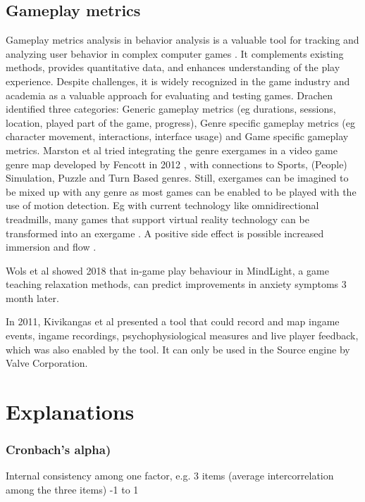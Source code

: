 \section{Gameplay metrics}
Gameplay metrics analysis in behavior analysis is a valuable tool for tracking and analyzing user behavior in complex computer games \cite{drachen2015behavioral}. It complements existing methods, provides quantitative data, and enhances understanding of the play experience. Despite challenges, it is widely recognized in the game industry and academia as a valuable approach for evaluating and testing games. Drachen identified three categories: Generic gameplay metrics (eg durations, sessions, location, played part of the game, progress), Genre specific gameplay metrics (eg character movement, interactions, interface usage) and Game specific gameplay metrics.
Marston et al \cite{marston2013play} tried integrating the genre exergames in a video game genre map developed by Fencott in 2012 \cite{clay2012game}, with connections to Sports, (People) Simulation, Puzzle and Turn Based genres. Still, exergames can be imagined to be mixed up with any genre as most games can be enabled to be played with the use of motion detection. Eg with current technology like omnidirectional treadmills, many games that support virtual reality technology can be transformed into an exergame \cite{link_katvr}. A positive side effect is possible increased immersion and flow \cite{wehden2021slippery}.

Wols et al \cite{wols2018game} showed 2018 that in-game play behaviour in MindLight, a game teaching relaxation methods, can predict improvements in anxiety symptoms 3 month later.

In 2011, Kivikangas et al \cite{kivikangas2011developing} presented a tool that could record and map ingame events, ingame recordings, psychophysiological measures and live player feedback, which was also enabled by the tool. It can only be used in the Source engine by Valve Corporation.




\chapter{Explanations}


\subsection{Cronbach's alpha)}
Internal consistency among one factor, e.g. 3 items (average intercorrelation among the three items)
-1 to 1


